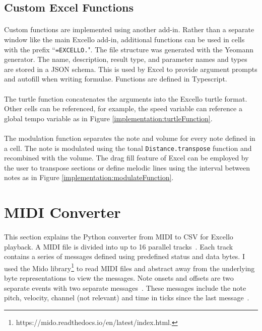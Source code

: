\subsection{Custom Excel Functions}

\paragraph{} Custom functions are implemented using another add-in. Rather than a separate window like the main Excello add-in, additional functions can be used in cells with the prefix ``\texttt{=EXCELLO.}". The file structure was generated with the Yeomann generator. The name, description, result type, and parameter names and types are stored in a JSON schema. This is used by Excel to provide argument prompts and autofill when writing formulae. Functions are defined in Typescript.

\paragraph{} The turtle function concatenates the arguments into the Excello turtle format. Other cells can be referenced, for example, the speed variable can reference a global tempo variable as in Figure \ref{implementation:turtleFunction}.

\paragraph{} The modulation function separates the note and volume for every note defined in a cell. The note is modulated using the tonal \texttt{Distance.transpose} function and recombined with the volume. The drag fill feature of Excel can be employed by the user to transpose sections or define melodic lines using the interval between notes as in Figure \ref{implementation:modulateFunction}.

\section{MIDI Converter}

\paragraph{} This section explains the Python converter from MIDI to CSV for Excello playback. A MIDI file is divided into up to 16 parallel tracks~\cite{midiSpec}. Each track contains a series of messages defined using predefined status and data bytes. I used the Mido library\footnote{https://mido.readthedocs.io/en/latest/index.html.} to read MIDI files and abstract away from the underlying byte representations to view the messages. Note onsets and offsets are two separate events with two separate messages~\cite{midiSpec}. These messages include the note pitch, velocity, channel (not relevant) and time in ticks since the last message~\cite{midoSpec}.

